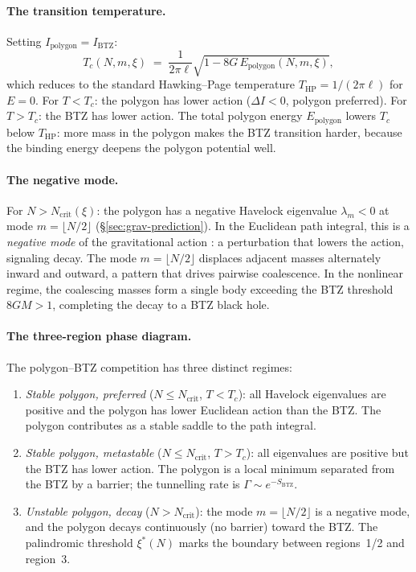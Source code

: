\paragraph{The transition temperature.}
Setting $I_{\mathrm{polygon}} = I_{\mathrm{BTZ}}$:
\begin{equation}
  \label{eq:polygon-hp}
  T_c(N,m,\xi) \;=\;
    \frac{1}{2\pi\ell}
    \sqrt{1 - 8G\,E_{\mathrm{polygon}}(N,m,\xi)},
\end{equation}
which reduces to the standard Hawking--Page temperature
$T_{\mathrm{HP}} = 1/(2\pi\ell)$ for $E = 0$.
For $T < T_c$: the polygon has lower action
($\Delta I < 0$, polygon preferred).
For $T > T_c$: the BTZ has lower action.
The total polygon energy $E_{\mathrm{polygon}}$
lowers $T_c$ below $T_{\mathrm{HP}}$: more mass in the
polygon makes the BTZ transition harder, because the
binding energy deepens the polygon potential well.

\paragraph{The negative mode.}
For $N > N_{\mathrm{crit}}(\xi)$: the polygon has a negative
Havelock eigenvalue
$\lambda_m < 0$ at mode $m = \lfloor N/2 \rfloor$
(\S\ref{sec:grav-prediction}).
In the Euclidean path integral, this is a \emph{negative mode}
of the gravitational action
\citep{GiombiMaloneyYin2008}: a perturbation that lowers the
action, signaling decay.
The mode $m = \lfloor N/2\rfloor$ displaces adjacent masses
alternately inward and outward, a pattern that drives pairwise
coalescence.
In the nonlinear regime, the coalescing masses form a single
body exceeding the BTZ threshold $8GM > 1$, completing the
decay to a BTZ black hole.

\paragraph{The three-region phase diagram.}
The polygon--BTZ competition has three distinct regimes:
\begin{enumerate}
\item \emph{Stable polygon, preferred}
  ($N \le N_{\mathrm{crit}}$, $T < T_c$):
  all Havelock eigenvalues are positive and the polygon has
  lower Euclidean action than the BTZ.
  The polygon contributes as a stable saddle to the path
  integral.
\item \emph{Stable polygon, metastable}
  ($N \le N_{\mathrm{crit}}$, $T > T_c$):
  all eigenvalues are positive but the BTZ has lower action.
  The polygon is a local minimum separated from the BTZ by a
  barrier; the tunnelling rate is $\Gamma \sim e^{-S_{\mathrm{BTZ}}}$.
\item \emph{Unstable polygon, decay}
  ($N > N_{\mathrm{crit}}$):
  the mode $m = \lfloor N/2\rfloor$ is a negative mode, and
  the polygon decays continuously (no barrier) toward the BTZ.
  The palindromic threshold $\xi^*(N)$ marks the boundary
  between regions~1/2 and region~3.
\end{enumerate}

